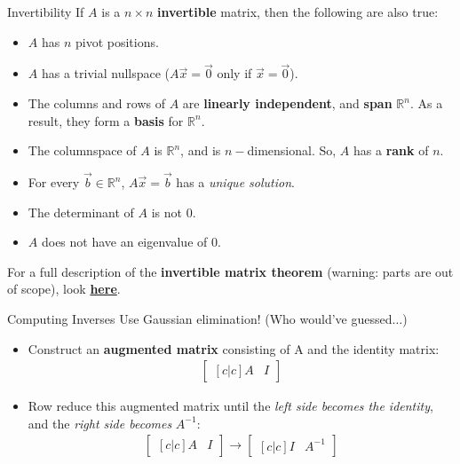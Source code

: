 \begin{frame}{Invertibility}
    If $A$ is a $n \times n$ \textbf{invertible} matrix, then the following are also true:
    \begin{itemize}
        \item $A$ has $n$ pivot positions.
        \item $A$ has a trivial nullspace ($A\vec{x} = \vec{0}$ only if $\vec{x} = \vec{0}$).
        \item The columns and rows of $A$ are \textbf{linearly independent}, and \textbf{span} $\mathbb{R}^n$. As a result, they form a \textbf{basis} for $\mathbb{R}^n$.
        \item The columnspace of $A$ is $\mathbb{R}^n$, and is $n-$dimensional. So, $A$ has a \textbf{rank} of $n$.
        \item For every $\vec{b} \in \mathbb{R}^n$, $A\vec{x} = \vec{b}$ has a \textit{unique solution}.
        \item The determinant of $A$ is not 0.
        \item $A$ does not have an eigenvalue of 0.
    \end{itemize}
    For a full description of the \textbf{invertible matrix theorem} (warning: parts are out of scope), look \textbf{\textcolor{red}{\href{https://math.dartmouth.edu/archive/m22f06/public_html/imt.pdf}{here}}}.
\end{frame}

\begin{frame}{Computing Inverses}
    Use Gaussian elimination! (Who would’ve guessed$\dots$) \\[1ex]
    \begin{itemize}
        \item Construct an \textbf{augmented matrix} consisting of A and the identity matrix:
        \begin{align*}
            \begin{bmatrix}[c | c]
                A & I
            \end{bmatrix}
        \end{align*}
        \item Row reduce this augmented matrix until the \textit{left side becomes the identity}, and the \textit{right side becomes} $A^{-1}$:
        \begin{align*}
            \begin{bmatrix}[c | c]
                A & I
            \end{bmatrix} \longrightarrow
            \begin{bmatrix}[c | c]
                I & A^{-1}
            \end{bmatrix}
        \end{align*}
    \end{itemize}
\end{frame}

